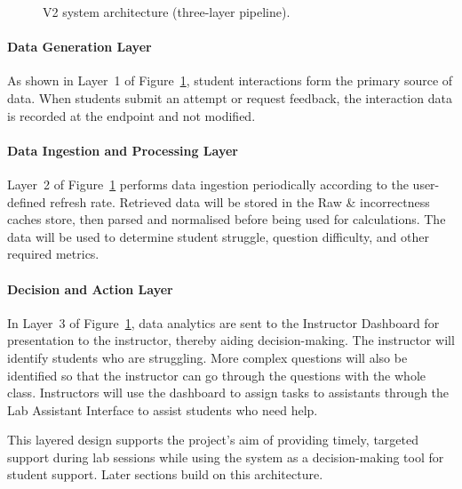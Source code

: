 \begin{figure}[H]
{}
    \caption{V2 system architecture (three-layer pipeline).}
    \label{fig: system architecture}
\end{figure}

\paragraph{Data Generation Layer}
As shown in Layer~1 of Figure~\ref{fig: system architecture}, student interactions form the primary source of data. When students submit an attempt or request feedback, the interaction data is recorded at the endpoint and not modified.

\paragraph{Data Ingestion and Processing Layer}
Layer~2 of Figure~\ref{fig: system architecture} performs data ingestion periodically according to the user-defined refresh rate. Retrieved data will be stored in the Raw \& incorrectness caches store, then parsed and normalised before being used for calculations. The data will be used to determine student struggle, question difficulty, and other required metrics.

\paragraph{Decision and Action Layer}
In Layer~3 of Figure~\ref{fig: system architecture}, data analytics are sent to the Instructor Dashboard for presentation to the instructor, thereby aiding decision-making. The instructor will identify students who are struggling. More complex questions will also be identified so that the instructor can go through the questions with the whole class. Instructors will use the dashboard to assign tasks to assistants through the Lab Assistant Interface to assist students who need help.

This layered design supports the project's aim of providing timely, targeted support during lab sessions while using the system as a decision-making tool for student support. Later sections build on this architecture.

